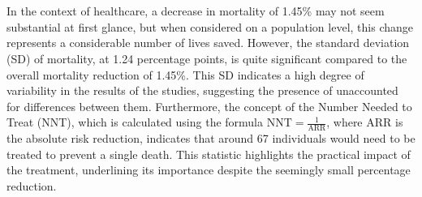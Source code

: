 \documentclass[12pt]{article}
\begin{document}
\begin{itemize}
\begin{itemize}
\begin{itemize}
{\\ \\
In the context of healthcare, a decrease in mortality of 1.45\% may not seem substantial at first glance, but when considered on a population level, this change represents a considerable number of lives saved. However, the standard deviation (SD) of mortality, at 1.24 percentage points, is quite significant compared to the overall mortality reduction of 1.45\%. This SD indicates a high degree of variability in the results of the studies, suggesting the presence of unaccounted for differences between them. Furthermore, the concept of the Number Needed to Treat (NNT), which is calculated using the formula \( \text{NNT} = \frac{1}{\text{ARR}} \), where ARR is the absolute risk reduction, indicates that around 67 individuals would need to be treated to prevent a single death. This statistic highlights the practical impact of the treatment, underlining its importance despite the seemingly small percentage reduction.
}

\end{itemize}

\end{itemize}

\end{itemize}
\end{document}
